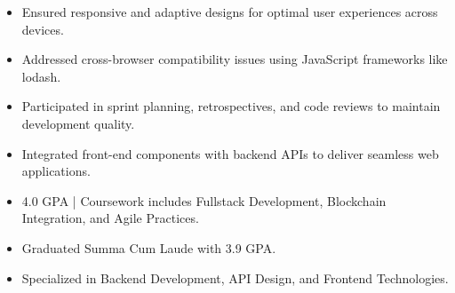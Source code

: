 \par\smallskip
\noindent
\begin{minipage}{20cm}
  \begin{minipage}{9.75cm}
    \begin{itemize}
      \item Ensured responsive and adaptive designs for optimal user experiences across devices.
      \item Addressed cross-browser compatibility issues using JavaScript frameworks like lodash.
    \end{itemize}
  \end{minipage}
  \hfill
  \begin{minipage}{9.75cm}
    \begin{itemize}
      \item Participated in sprint planning, retrospectives, and code reviews to maintain development quality.
      \item Integrated front-end components with backend APIs to deliver seamless web applications.
    \end{itemize}
  \end{minipage}
\end{minipage}
\par\smallskip
\divider

\begin{itemize}
  \item 4.0 GPA | Coursework includes Fullstack Development, Blockchain Integration, and Agile Practices.
\end{itemize}
\divider

\begin{itemize}
  \item Graduated Summa Cum Laude with 3.9 GPA.
  \item Specialized in Backend Development, API Design, and Frontend Technologies.
\end{itemize}

\noindent
\begin{minipage}{20cm}
\end{minipage}


